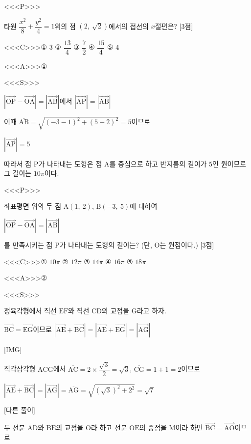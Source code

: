 \documentclass{oblivoir}
\begin{document}
<<<P>>>

타원  $\dfrac{x^{2}}{8}+\dfrac{y^{2}}{4}=1$위의 점 $(2,\:\sqrt{2})$에서의 접선의 $x$절편은? [3점]

<<<C>>>① $3$ ② $\dfrac{13}{4}$ ③ $\dfrac{7}{2}$ ④ $\dfrac{15}{4}$ ⑤ $4$

<<<A>>>①

<<<S>>>

$|\overrightarrow{\mathrm{OP}}-\overrightarrow{\mathrm{OA}}| = |\overrightarrow{\mathrm{AB}}|$에서 $|\overrightarrow{\mathrm{AP}}| = |\overrightarrow{\mathrm{AB}}|$

이때 $\overline{\mathrm{AB}}=\sqrt{(-3-1)^{2}+(5-2)^{2}}=5$이므로

$|\overrightarrow{\mathrm{AP}}| =5$

따라서 점 $\mathrm{P}$가 나타내는 도형은 점 $\mathrm{A}$를 중심으로 하고 반지름의 길이가 $5$인 원이므로 그 길이는 $10\pi$이다.

<<<P>>>

좌표평면 위의 두 점 $\mathrm{A}(1,\: 2)$, $\mathrm{B}(-3,\: 5)$에 대하여 

$|\overrightarrow{\mathrm{OP}}-\overrightarrow{\mathrm{OA}}| = |\overrightarrow{\mathrm{AB}}|$

를 만족시키는 점 $\mathrm{P}$가 나타내는 도형의 길이는? (단, $\mathrm{O}$는 원점이다.) [3점]

<<<C>>>① $10\pi$ ② $12\pi$ ③ $14\pi$ ④ $16\pi$ ⑤ $18\pi$

<<<A>>>②

<<<S>>>

정육각형에서 직선 $\mathrm{EF}$와 직선 $\mathrm{CD}$의 교점을 $\mathrm{G}$라고 하자.

$\overrightarrow{\mathrm{BC}}=\overrightarrow{\mathrm{EG}}$이므로 $|\overrightarrow{\mathrm{AE}}+\overrightarrow{\mathrm{BC}}| = |\overrightarrow{\mathrm{AE}}+\overrightarrow{\mathrm{EG}}| = |\overrightarrow{\mathrm{AG}}|$

[IMG]

직각삼각형 $\mathrm{ACG}$에서 $\overline{\mathrm{AC}}= 2\times\dfrac{\sqrt{3}}{2}=\sqrt{3}$, $\overline{\mathrm{CG}}=1+1=2$이므로

$|\overrightarrow{\mathrm{AE}}+\overrightarrow{\mathrm{BC}}| = |\overrightarrow{\mathrm{AG}}| =\overline{\mathrm{AG}}=\sqrt{(\sqrt{3})^{2}+2^{2}}=\sqrt{7}$

[다른 풀이]

두 선분  $\mathrm{AD}$와 $\mathrm{BE}$의 교점을 $\mathrm{O}$라 하고 선분 $\mathrm{OE}$의 중점을 $\mathrm{M}$이라 하면 $\overrightarrow{\mathrm{BC}}=\overrightarrow{\mathrm{AO}}$이므로
\end{document}
